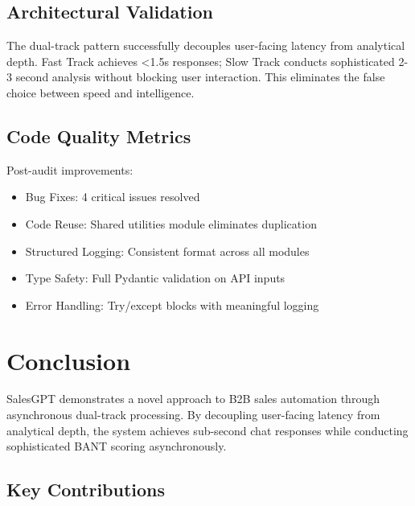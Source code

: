 \documentclass[10pt,twocolumn,a4paper]{article}
\begin{document}
\subsection{Architectural Validation}

The dual-track pattern successfully decouples user-facing latency from analytical depth. Fast Track achieves <1.5s responses; Slow Track conducts sophisticated 2-3 second analysis without blocking user interaction. This eliminates the false choice between speed and intelligence.

\subsection{Code Quality Metrics}

Post-audit improvements:

\begin{itemize}
    \item Bug Fixes: 4 critical issues resolved
    \item Code Reuse: Shared utilities module eliminates duplication
    \item Structured Logging: Consistent format across all modules
    \item Type Safety: Full Pydantic validation on API inputs
    \item Error Handling: Try/except blocks with meaningful logging
\end{itemize}


\section{Conclusion}

SalesGPT demonstrates a novel approach to B2B sales automation through asynchronous dual-track processing. By decoupling user-facing latency from analytical depth, the system achieves sub-second chat responses while conducting sophisticated BANT scoring asynchronously.

\subsection{Key Contributions}
\end{document}
